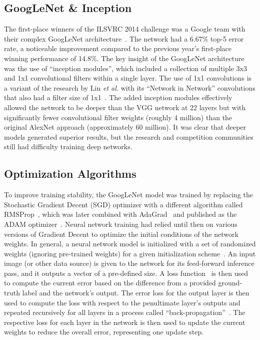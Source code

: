 \subsection{GoogLeNet \& Inception}

The first-place winners of the ILSVRC 2014 challenge was a Google team with their complex GoogLeNet architecture~\cite{szegedy_going_2015,chollet_xception_2017}.  The network had a 6.67\% top-5 error rate, a noticeable improvement compared to the previous year's first-place winning performance of 14.8\%.  The key insight of the GoogLeNet architecture was the use of ``inception modules'', which included a collection of multiple 3x3 and 1x1 convolutional filters within a single layer.  The use of 1x1 convolutions is a variant of the research by Lin \textit{et al.} with its ``Network in Network'' convolutions that also had a filter size of 1x1~\cite{lin_network_2013}.  The added inception modules effectively allowed the network to be deeper than the VGG network at 22 layers but with significantly fewer convolutional filter weights (roughly 4 million) than the original AlexNet approach (approximately 60 million).  It was clear that deeper models generated superior results, but the research and competition communities still had difficulty training deep networks.

\subsection{Optimization Algorithms}

To improve training stability, the GoogLeNet model was trained by replacing the Stochastic Gradient Decent (SGD) optimizer with a different algorithm called RMSProp~\cite{ruder_overview_2016}, which was later combined with AdaGrad~\cite{duchi_adaptive_2011} and published as the ADAM optimizer~\cite{kingma_adam:_2014}.  Neural network training had relied until then on various versions of Gradient Decent to optimize the initial conditions of the network weights.  In general, a neural network model is initialized with a set of randomized weights (ignoring pre-trained weights) for a given initialization scheme~\cite{mishkin_all_2015,sutskever_importance_2013,bengio_greedy_2007}.  An input image (or other data source) is given to the network for its feed-forward inference pass, and it outputs a vector of a pre-defined size.  A loss function~\cite{specht_probabilistic_1990} is then used to compute the current error based on the difference from a provided ground-truth label and the network's output.  The error loss for the output layer is then used to compute the loss with respect to the penultimate layer's outputs and repeated recursively for all layers in a process called ``back-propagation''~\cite{hecht-nielsen_theory_1989,rumelhart_learning_1986,specht_biased_2018}.  The respective loss for each layer in the network is then used to update the current weights to reduce the overall error, representing one update step.

